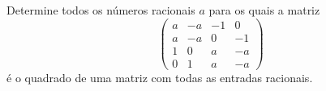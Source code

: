 Determine todos os números racionais \(a\) para os quais a matriz
\[\begin{pmatrix}
    a       & -a & -1 & 0 \\
    a       & -a & 0 & -1 \\
    1  & 0 & a & -a\\
    0      & 1 & a &  -a
\end{pmatrix}\]é o quadrado de uma matriz com todas as entradas racionais.

